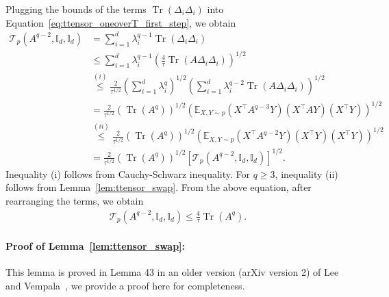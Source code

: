 \documentclass[11pt,twoside]{article}
\newcommand{\ttensor}{\mathcal{T}}
\theoremstyle{named}
\theoremstyle{plain}
\newcommand{\Exs}{\ensuremath{{\mathbb{E}}}}
\newcommand{\usedim}{\ensuremath{d}}
\newcommand{\dims}{\usedim}
\DeclareMathOperator{\trace}{Tr}
\newcommand{\Ind}{\ensuremath{\mathbb{I}}}
\newcommand{\brackets}[1]{\left[ #1 \right]}
\newcommand{\parenth}[1]{\left( #1 \right)}
\newcommand{\tp}{^\top}
\begin{document}
Plugging the bounds of the terms $\trace\parenth{\Delta_i \Delta_i}$ into Equation~\eqref{eq:ttensor_oneoverT_first_step}, we obtain
\begin{align*}
  \ttensor_p\parenth{A^{q-2}, \Ind_\dims, \Ind_\dims} &= \sum_{i=1}^\dims \lambda_i^{q-1} \trace\parenth{\Delta_i \Delta_i} \\
  &\leq \sum_{i=1}^\dims \lambda_i^{q-1}  \parenth{\frac{4}{\tau} \trace\parenth{A \Delta_i \Delta_i}}^{1/2} \\
  &\stackrel{(i)}{\leq} \frac{2}{\tau^{1/2}} \parenth{\sum_{i=1}^\dims \lambda_i^{q}}^{1/2}  \parenth{\sum_{i=1}^\dims \lambda_i^{q-2} \trace\parenth{A \Delta_i \Delta_i} }^{1/2} \\
  &= \frac{2}{\tau^{1/2}} \parenth{\trace\parenth{A^q}}^{1/2}  \parenth{\Exs_{X, Y \sim p} \parenth{X\tp A^{q-3} Y} (X\tp A Y) (X \tp Y) }^{1/2} \\
  &\stackrel{(ii)}{\leq} \frac{2}{\tau^{1/2}} \parenth{\trace\parenth{A^q}}^{1/2}  \parenth{\Exs_{X, Y \sim p} \parenth{X\tp A^{q-2} Y} (X\tp Y) (X \tp Y) }^{1/2} \\
  &= \frac{2}{\tau^{1/2}} \parenth{\trace\parenth{A^q}}^{1/2}  \brackets{\ttensor_p\parenth{A^{q-2}, \Ind_\dims, \Ind_\dims} }^{1/2}.
\end{align*}
Inequality (i) follows from Cauchy-Schwarz inequality. For $q \geq 3$, inequality (ii) follows from Lemma~\ref{lem:ttensor_swap}. From the above equation, after rearranging the terms, we obtain
\begin{align*}
  \ttensor_p\parenth{A^{q-2}, \Ind_\dims, \Ind_\dims} \leq \frac{4}{\tau} \trace\parenth{A^q}.
\end{align*}

\paragraph{Proof of Lemma~\ref{lem:ttensor_swap}: } This lemma is proved in Lemma 43 in an older version (arXiv version 2) of Lee and Vempala~\cite{lee2016eldan}, we provide a proof here for completeness.
\end{document}
